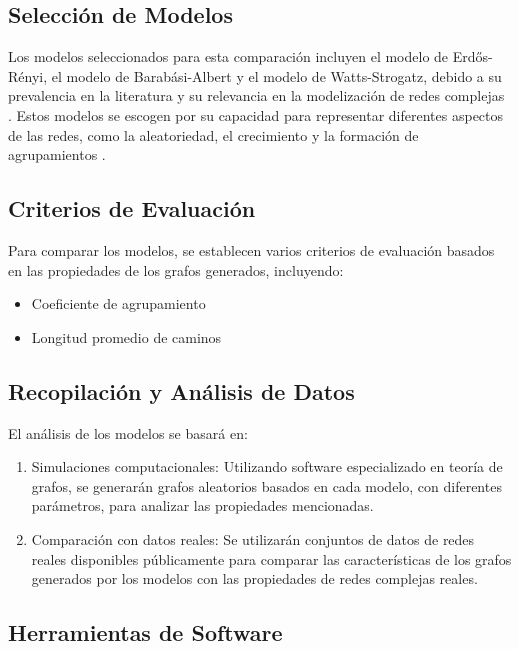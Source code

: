 \subsection{Selección de Modelos}

Los modelos seleccionados para esta comparación incluyen el modelo de Erdős-Rényi, el modelo de Barabási-Albert y el modelo de Watts-Strogatz, debido a su prevalencia en la literatura y su relevancia en la modelización de redes complejas . Estos modelos se escogen por su capacidad para representar diferentes aspectos de las redes, como la aleatoriedad, el crecimiento y la formación de agrupamientos .

\subsection{Criterios de Evaluación}

Para comparar los modelos, se establecen varios criterios de evaluación basados en las propiedades de los grafos generados, incluyendo:
\begin{itemize}
    \item Coeficiente de agrupamiento
    \item Longitud promedio de caminos
\end{itemize}

\subsection{Recopilación y Análisis de Datos}

El análisis de los modelos se basará en:
\begin{enumerate}
    \item Simulaciones computacionales: Utilizando software especializado en teoría de grafos, se generarán grafos aleatorios basados en cada modelo, con diferentes parámetros, para analizar las propiedades mencionadas.
    \item Comparación con datos reales: Se utilizarán conjuntos de datos de redes reales disponibles públicamente para comparar las características de los grafos generados por los modelos con las propiedades de redes complejas reales.
\end{enumerate}

\subsection{Herramientas de Software}

